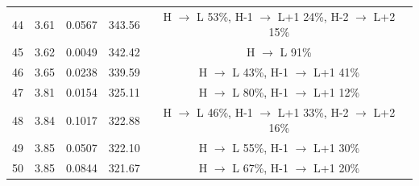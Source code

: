 \begin{table}[H]
{\begin{center}
\begin{tabular}{ccccc}
44 & 3.61 & 0.0567 & 343.56 & H $\rightarrow$ L 53\%, H-1 $\rightarrow$ L+1 24\%, H-2 $\rightarrow$ L+2 15\% \\
45 & 3.62 & 0.0049 & 342.42 & H $\rightarrow$ L 91\% \\
46 & 3.65 & 0.0238 & 339.59 & H $\rightarrow$ L 43\%, H-1 $\rightarrow$ L+1 41\% \\
47 & 3.81 & 0.0154 & 325.11 & H $\rightarrow$ L 80\%, H-1 $\rightarrow$ L+1 12\% \\
48 & 3.84 & 0.1017 & 322.88 & H $\rightarrow$ L 46\%, H-1 $\rightarrow$ L+1 33\%, H-2 $\rightarrow$ L+2 16\% \\
49 & 3.85 & 0.0507 & 322.10 & H $\rightarrow$ L 55\%, H-1 $\rightarrow$ L+1 30\% \\
50 & 3.85 & 0.0844 & 321.67 & H $\rightarrow$ L 67\%, H-1 $\rightarrow$ L+1 20\% \\
\hline
\end{tabular}
\end{center} }
\vspace{-0.2cm}
\end{table} \newpage \noindent

